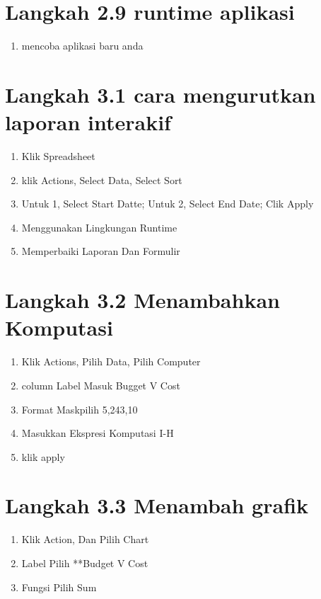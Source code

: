 \documentclass{article}
\begin{document}
\section{ Langkah 2.9 runtime aplikasi}
\begin{enumerate}
    \item mencoba aplikasi baru anda


\end{enumerate}
\section{ Langkah 3.1 cara mengurutkan laporan interakif}
\begin{enumerate}
    \item Klik Spreadsheet
    \item klik Actions, Select Data, Select Sort
    \item Untuk 1, Select Start Datte; Untuk 2, Select End Date; Clik Apply
    \item Menggunakan Lingkungan Runtime
    \item Memperbaiki Laporan Dan Formulir


\end{enumerate}

\section{ Langkah 3.2 Menambahkan Komputasi}
\begin{enumerate}
    \item Klik Actions, Pilih Data, Pilih Computer
    \item column Label Masuk Bugget V Cost
    \item Format Maskpilih 5,243,10
    \item Masukkan Ekspresi Komputasi I-H
    \item klik apply

\end{enumerate}

\section{ Langkah 3.3 Menambah grafik}
\begin{enumerate}
    \item Klik Action, Dan Pilih Chart
    \item Label Pilih **Budget V Cost
    \item Fungsi Pilih Sum
   

\end{enumerate}
\end{document}
